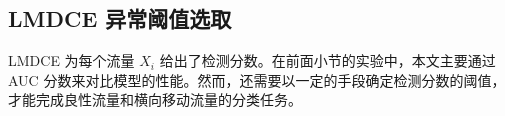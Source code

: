 {%







\subsection{LMDCE 异常阈值选取}
\label{sec:threshold}

LMDCE 为每个流量 $X_i$ 给出了检测分数。在前面小节的实验中，本文主要通过 AUC 分数来对比模型的性能。然而，还需要以一定的手段确定检测分数的阈值，才能完成良性流量和横向移动流量的分类任务。

}
